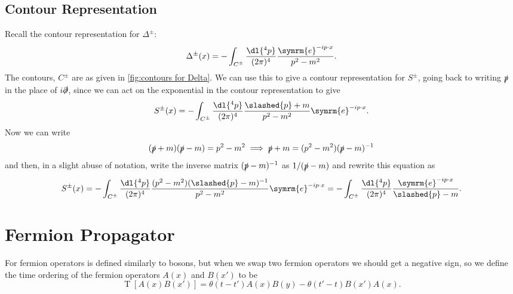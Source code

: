 \documentclass[fleqn]{NotesClass}
\newcommand{\e}{\symrm{e}}
\newcommand{\heaviside}{\theta}
\DeclareMathOperator{\timeOrdering}{T}
\begin{document}
    \subsection{Contour Representation}
    Recall the contour representation for \(\Delta^{\pm}\):
    \begin{equation}
        \Delta^{\pm}(x) = -\int_{C^{\pm}} \frac{\dl{^4p}}{(2\pi)^4} \frac{\e^{-ip\cdot x}}{p^2 - m^2}.
    \end{equation}
    The contours, \(C^{\pm}\) are as given in \cref{fig:contours for Delta}.
    We can use this to give a contour representation for \(S^{\pm}\), going back to writing \(\slashed{p}\) in the place of \(i\slashed{\partial}\), since we can act on the exponential in the contour representation to give
    \begin{equation}
        S^{\pm}(x) = -\int_{C^{\pm}} \frac{\dl{^4p}}{(2\pi)^4} \frac{\slashed{p} + m}{p^2 - m^2} \e^{-ip\cdot x}.
    \end{equation}
    Now we can write
    \begin{equation}
        (\slashed{p} + m)(\slashed{p} - m) = p^2 - m^2 \implies \slashed{p} + m = (p^2 - m^2)(\slashed{p} - m)^{-1}
    \end{equation}
    and then, in a slight abuse of  notation, write the inverse matrix \((\slashed{p} - m)^{-1}\) as \(1/(\slashed{p} - m)\) and rewrite this equation as
    \begin{equation}
        S^{\pm}(x) = -\int_{C^{\pm}} \frac{\dl{^4p}}{(2\pi)^4} \frac{(p^2 - m^2)(\slashed{p} - m)^{-1}}{p^2 - m^2} \e^{-ip\cdot x} = -\int_{C^{\pm}} \frac{\dl{^4p}}{(2\pi)^4} \frac{\e^{-ip\cdot x}}{\slashed{p} - m}.
    \end{equation}
    
    \section{Fermion Propagator}
    For fermion operators  is defined similarly to bosons, but when we swap two fermion operators we should get a negative sign, so we define the time ordering of the fermion operators \(A(x)\) and \(B(x')\) to be
    \begin{equation}
        \timeOrdering[A(x)B(x')] = \heaviside(t - t') A(x)B(y) - \heaviside(t' - t)B(x')A(x).
    \end{equation}
    
\end{document}
